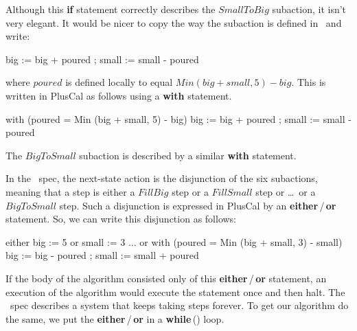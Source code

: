 \documentclass[fleqn,leqno]{article}
\begin{document}
Although this \textbf{if} statement correctly describes the
$SmallToBig$ subaction, it isn't very elegant.  It would be nicer to
copy the way the subaction is defined in \tlaplus\ and write:
\begin{display}
\begin{nopcal}
big   := big + poured ;                 
small := small - poured
\end{nopcal}
\begin{tlatex}
%
%
\end{tlatex}
\end{display}
where $poured$ is defined locally to equal $Min (big + small, 5) - big$.
This is written in PlusCal as follows using a 
\textbf{with} statement.
\begin{display}
\begin{nopcal}
with (poured = Min (big + small, 5) - big)  
  { big   := big + poured ;                 
    small := small - poured  }
\end{nopcal}
\begin{tlatex}
%
\end{tlatex}
\end{display}
The $BigToSmall$ subaction is described by a similar \textbf{with}
statement.

In the \tlaplus\ spec, the next-state action is the disjunction of the
six subactions, meaning that a step is either a $FillBig$ step or a
$FillSmall$ step or \ldots\ or a $BigToSmall$ step.  Such a disjunction is
expressed in PlusCal by an \textbf{either}\,/\,\textbf{or} statement.
So, we can write this disjunction as follows:
\begin{display}
\begin{nopcal}
either big := 5    
or     small := 3  
...
or     with (poured = Min (big + small, 3) - small)  
         { big   := big - poured ;                 
           small := small + poured }
\end{nopcal}
\begin{tlatex}
%
%
\@x{ \.{\dots}}%
%
\end{tlatex}
\end{display}
If the body of the algorithm consisted only of this
\textbf{either}\,/\,\textbf{or} statement, an execution of the
algorithm would execute the statement once and then halt.  The
\tlaplus\ spec describes a system that keeps taking steps forever.  To
get our algorithm do the same, we put the
\textbf{either}\,/\,\textbf{or} in a \textbf{while}\,(\TRUE) loop.
\end{document}
